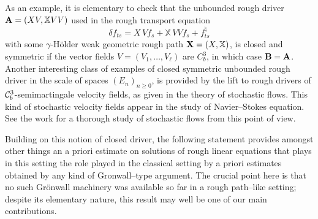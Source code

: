 \documentclass[11pt,a4paper]{amsart}
\newcommand{\bbX}{\mathbb{X}}
\renewcommand{\geq}{\geqslant}
\theoremstyle{plain}%
\theoremstyle{definition}
\theoremstyle{remark}
\numberwithin{equation}{section} %
\begin{document}
\smallskip

As an example, it is elementary to check that the unbounded rough driver ${\bfA} = (XV,\bbX VV)$ used in the rough transport equation
\begin{equation*}
\delta f_{ts} = X\,Vf_s +  \bbX\,V V f_s + f^\natural_{ts}
\end{equation*}
with some $\gamma$-H\"older weak geometric rough path ${\bfX} = (X,\bbX)$, is closed and symmetric if the vector fields $V = (V_1,\dots,V_\ell)$ are $C^3_b$, in which case $\bf B = \bf A$. Another interesting class of examples of closed symmetric unbounded rough driver in the scale of spaces $(E_n)_{n\geq 0}$, is provided by the lift to rough drivers of $\mathcal{C}^3_b$-semimartingale velocity fields, as given in the theory of stochastic flows. This kind of stochastic velocity fields appear in the study of Navier--Stokes equation. See the work \cite{BailleulRiedel} for a thorough study of stochastic flows from this point of view. 

\medskip

Building on this notion of closed driver, the following statement provides amongst other things an a priori estimate on solutions of rough linear equations that plays in this setting the role played in the classical setting by a priori estimates obtained by any kind of Gronwall--type argument. The crucial point here is that no such Gr\"onwall machinery was available so far in a rough path--like setting; despite its elementary nature, this result may well be one of our main contributions. 

\smallskip
\end{document}
